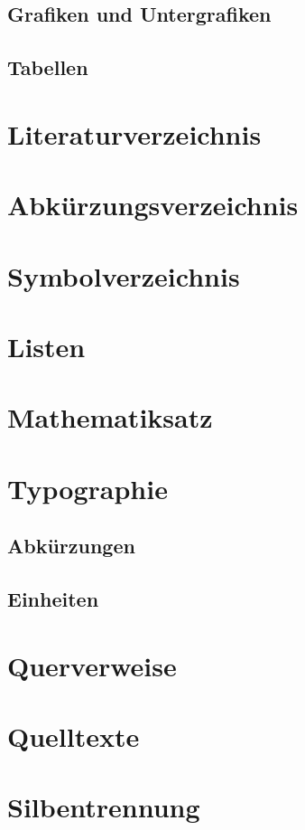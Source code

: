 \documentclass[english,ngerman]{tudscrartcl}
\begin{document}
\subsection{Grafiken und Untergrafiken}
\subsection{Tabellen}

\section{Literaturverzeichnis}

\section{Abkürzungsverzeichnis}

\section{Symbolverzeichnis}

\section{Listen}

\section{Mathematiksatz}

\section{Typographie}
\subsection{Abkürzungen}
\subsection{Einheiten}

\section{Querverweise}

\section{Quelltexte}

\section{Silbentrennung}
\end{document}
